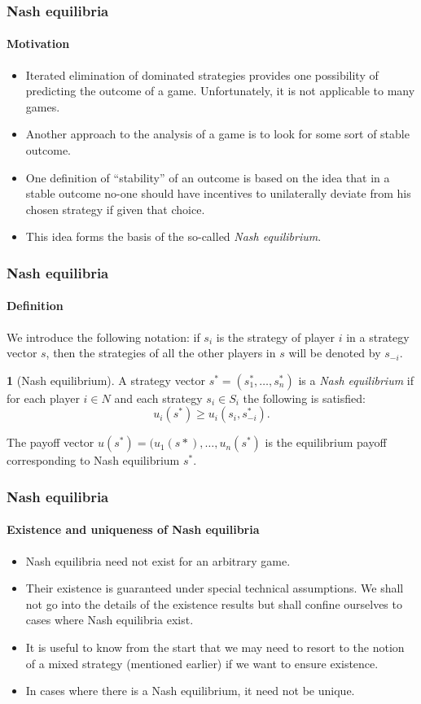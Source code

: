 \documentclass[10pt]{beamer}
\theoremstyle{definition}
\newtheorem{definition}{\translate{Definition}}
\begin{document}
\begin{frame}[fragile]
\frametitle{Nash equilibria}
\framesubtitle{Motivation}
\begin{itemize}\itemsep1em
\item Iterated elimination of dominated strategies provides one possibility of predicting the outcome of a game. Unfortunately, it is not applicable to many games.
\item Another approach to the analysis of a game is to look for some sort of stable outcome.
\item One definition of ``stability'' of an outcome is based on the idea that in a stable outcome no-one should have incentives to unilaterally deviate from his chosen strategy if given that choice.
\item This idea forms the basis of the so-called \emph{Nash equilibrium}.
\end{itemize}
\end{frame}



\begin{frame}[fragile]
\frametitle{Nash equilibria}
\framesubtitle{Definition}
We introduce the following notation: if $ s_i $ is the strategy of player $ i $ in a strategy vector $ s $, then the strategies of all the other players in $ s $ will be denoted by $ s_{-i} $.\bigskip

\begin{definition}[Nash equilibrium]\label{def:NashEq}
A strategy vector $ s^* = (s_1^*,\ldots,s_n^*) $ is a \emph{Nash equilibrium} if for each player $ i \in N $ and each strategy $ s_i \in S_i $ the following is satisfied:
\begin{equation}
u_i(s^*)\geq u_i(s_i,s^*_{-i}).
\label{eq:NE}
\end{equation}

The payoff vector $ u(s^*) = (u_1(s*),\ldots,u_n(s^*) $ is the equilibrium payoff corresponding to Nash equilibrium $ s^* $.
\end{definition}
\end{frame}



\begin{frame}[fragile]
\frametitle{Nash equilibria}
\framesubtitle{Existence and uniqueness of Nash equilibria}
\begin{itemize}\itemsep1em
\item Nash equilibria need not exist for an arbitrary game.
\item Their existence is guaranteed under special technical assumptions. We shall not go into the details of the existence results but shall confine ourselves to cases where Nash equilibria exist.
\item It is useful to know from the start that we may need to resort to the notion of a mixed strategy (mentioned earlier) if we want to ensure existence.
\item In cases where there is a Nash equilibrium, it need not be unique.
\end{itemize}
\end{frame}
\end{document}
